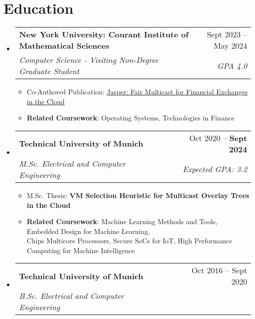 \documentclass[letterpaper,11pt]{article}
\makeatletter
\newcommand{\resumeItem}[1]{
  \item\small{
    {#1 \vspace{-2pt}}
  }
}
\newcommand{\resumeSubheading}[4]{
  \vspace{-2pt}\item
    \begin{tabular*}{0.97\textwidth}[t]{l@{\extracolsep{\fill}}r}
      \textbf{#1} & #2 \\
      \textit{\small#3} & \textit{\small #4} \\
    \end{tabular*}\vspace{-7pt}
}
\newcommand{\resumeSubHeadingListStart}{\begin{itemize}[leftmargin=0.15in, label={}]}
\newcommand{\resumeSubHeadingListEnd}{\end{itemize}}
\newcommand{\resumeItemListStart}{\begin{itemize}}
\newcommand{\resumeItemListEnd}{\end{itemize}\vspace{-5pt}}
\makeatother
\begin{document}
\section{Education}
  \resumeSubHeadingListStart
    \resumeSubheading
        {New York University: Courant Institute of Mathematical Sciences}{Sept 2023 -- May 2024}
        {Computer Science - Visiting Non-Degree Graduate Student}{GPA 4.0}
        \resumeItemListStart
            \resumeItem{Co-Authored Publication: \href{https://dl.acm.org/doi/10.1145/3672202.3673728}{Jasper: Fair Multicast for Financial Exchanges in the Cloud}}
            \resumeItem{\textbf{Related Coursework}: Operating Systems, Technologies in Finance}
        \resumeItemListEnd

    \vspace{3.0pt}
    \resumeSubheading
        {Technical University of Munich}{Oct 2020 -- \textbf{Sept 2024}}
        {M.Sc. Electrical and Computer Engineering}{\textit{Expected} GPA: 3.2}

        \resumeItemListStart
            \resumeItem{M.Sc. Thesis: \textbf{VM Selection Heuristic for Multicast Overlay Trees in the Cloud}}
            \resumeItem{\textbf{Related Coursework}: Machine Learning Methods and Tools, Embedded Design for Machine Learning, \\Chips Multicore Processors, Secure SoCs for IoT, High Performance Computing for Machine Intelligence}
        \resumeItemListEnd

    \vspace{3.0pt}
    \resumeSubheading
        {Technical University of Munich}{Oct 2016 -- Sept 2020}
        {B.Sc. Electrical and Computer Engineering}{}
        
  \resumeSubHeadingListEnd
\end{document}
